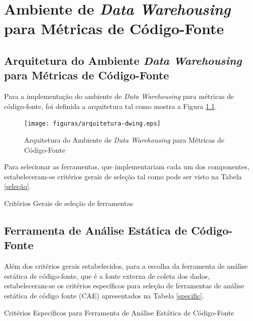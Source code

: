 \chapter{Ambiente de \textit{Data Warehousing} para Métricas de Código-Fonte}
\label{chap:arquitetura}

\section{Arquitetura do Ambiente \textit{Data Warehousing} para Métricas de Código-Fonte}
Para a implementação do ambiente de \textit{Data Warehousing} para métricas de código-fonte, foi definida a arquitetura tal como mostra a Figura \ref{arquitetura}.

\begin{figure}[ht!]
\centering
\texttt{[image: figuras/arquitetura-dwing.eps]}
\caption{Arquitetura do Ambiente de \textit{Data Warehousing} para Métricas de Código-Fonte}
\label{arquitetura}
\end{figure}
\FloatBarrier

Para selecionar as ferramentas, que implementariam cada um dos componentes, estabeleceram-se critérios gerais de seleção tal como pode ser visto na Tabela \ref{seleção}.


	\begin{table}[!ht]
	\begin{center}
	
	\caption{Critérios Gerais de seleção de ferramentas}
	\label{seleção}
	\end{center}
	\end{table}	


\section{Ferramenta de Análise Estática de Código-Fonte}

Além dos critérios gerais estabelecidos, para a escolha da ferramenta de análise estática de código-fonte, que é a fonte externa de coleta dos dados, estabeleceram-se os critérios específicos para seleção de ferramentas de análise estática de código fonte (CAE) apresentados na Tabela \ref{specific}.


	\begin{table}[!ht]
	\begin{center}
		
	\caption{Critérios Específicos para Ferramenta de Análise Estática de Código-Fonte}
	\label{specific}
	\end{center}
	\end{table}	

